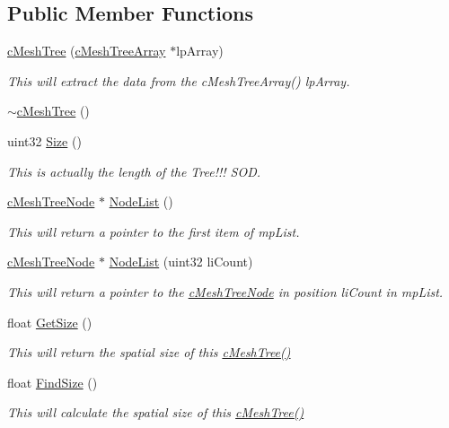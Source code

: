 \subsection*{Public Member Functions}
\begin{DoxyCompactItemize}
\item 
\hyperlink{classc_mesh_tree_a5847e3ca4f4f2531c6b0df1cd2c7a783}{cMeshTree} (\hyperlink{classc_mesh_tree_array}{cMeshTreeArray} $\ast$lpArray)
\begin{DoxyCompactList}\small\item\em This will extract the data from the cMeshTreeArray() lpArray. \item\end{DoxyCompactList}\item 
\hyperlink{classc_mesh_tree_a839ea25d4f8ffa6a3bffe621cf2d77b4}{$\sim$cMeshTree} ()
\item 
uint32 \hyperlink{classc_mesh_tree_ad237d995a19f136e6a77c82c64631826}{Size} ()
\begin{DoxyCompactList}\small\item\em This is actually the length of the Tree!!! SOD. \item\end{DoxyCompactList}\item 
\hyperlink{classc_mesh_tree_node}{cMeshTreeNode} $\ast$ \hyperlink{classc_mesh_tree_a2af67ab77feaed272985daf8b74ed662}{NodeList} ()
\begin{DoxyCompactList}\small\item\em This will return a pointer to the first item of mpList. \item\end{DoxyCompactList}\item 
\hyperlink{classc_mesh_tree_node}{cMeshTreeNode} $\ast$ \hyperlink{classc_mesh_tree_ae7545034b95adcf5e2f77fb009ffd803}{NodeList} (uint32 liCount)
\begin{DoxyCompactList}\small\item\em This will return a pointer to the \hyperlink{classc_mesh_tree_node}{cMeshTreeNode} in position liCount in mpList. \item\end{DoxyCompactList}\item 
float \hyperlink{classc_mesh_tree_a3c82682fe2453aed6c5cdcf0316894bd}{GetSize} ()
\begin{DoxyCompactList}\small\item\em This will return the spatial size of this \hyperlink{classc_mesh_tree_a5847e3ca4f4f2531c6b0df1cd2c7a783}{cMeshTree()} \item\end{DoxyCompactList}\item 
float \hyperlink{classc_mesh_tree_a66008bdef8db37c172502b0c7de87e31}{FindSize} ()
\begin{DoxyCompactList}\small\item\em This will calculate the spatial size of this \hyperlink{classc_mesh_tree_a5847e3ca4f4f2531c6b0df1cd2c7a783}{cMeshTree()} \item\end{DoxyCompactList}\end{DoxyCompactItemize}


